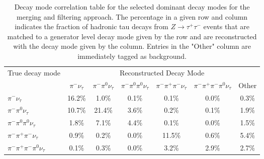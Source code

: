 
\begin{table}[htp]
   \centering
   \begin{tabular}{l|cccccc}

\multirow{2}{*}{True decay mode} & \multicolumn{6}{c}{Reconstructed Decay Mode}\\

 & $\pi^{-}\nu_\tau$ & $\pi^{-}\pi^0\nu_\tau$ & $\pi^{-}\pi^0\pi^0\nu_\tau$ & $\pi^{-}\pi^{+}\pi^{-}\nu_\tau$ & $\pi^{-}\pi^{+}\pi^{-}\pi^0\nu_\tau$& Other \\
\hline
$\pi^{-}\nu_\tau$ & 16.2\% &1.0\% &0.1\% &0.1\% &0.0\% & 0.3\% \\
$\pi^{-}\pi^0\nu_\tau$ & 10.7\% &21.4\% &3.6\% &0.2\% &0.1\% & 1.9\% \\
$\pi^{-}\pi^0\pi^0\nu_\tau$ & 1.8\% &7.1\% &4.4\% &0.1\% &0.0\% & 1.5\% \\
$\pi^{-}\pi^{+}\pi^{-}\nu_\tau$ & 0.9\% &0.2\% &0.0\% &11.5\% &0.6\% & 5.4\% \\
$\pi^{-}\pi^{+}\pi^{-}\pi^0\nu_\tau$ & 0.1\% &0.3\% &0.0\% &3.2\% &2.9\% & 2.7\% \\

\end{tabular}
\label{tab:dmResolutionStandard} \caption[Decay mode performance -- TaNC
reconstruction]{Decay mode correlation table for the selected dominant decay
modes for the merging and filtering approach.  The percentage in a given row and
column indicates the fraction of hadronic tau decays from
$Z\rightarrow\tau^{+}\tau^{-}$ events that are matched to a generator level
decay mode given by the row and are reconstructed with the decay mode given by
the column.  Entries in the "Other" column are immediately tagged as background.
}
\end{table}

